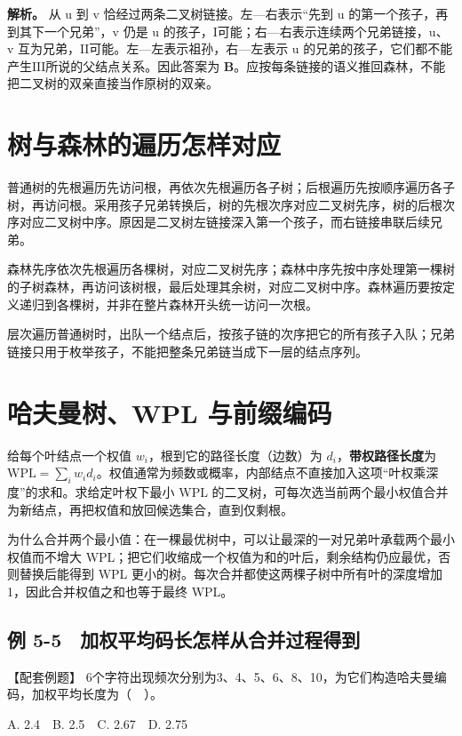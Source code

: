 \textbf{解析。} 从 u 到 v 恰经过两条二叉树链接。左---右表示``先到 u 的第一个孩子，再到其下一个兄弟''，v 仍是 u 的孩子，\ensuremath{\mathrm{I}}可能；右—右表示连续两个兄弟链接，u、v 互为兄弟，\ensuremath{\mathrm{II}}可能。左—左表示祖孙，右—左表示 u 的兄弟的孩子，它们都不能产生\ensuremath{\mathrm{III}}所说的父结点关系。因此答案为 \textbf{B}。应按每条链接的语义推回森林，不能把二叉树的双亲直接当作原树的双亲。

\section{树与森林的遍历怎样对应}\label{DS05-08}

普通树的先根遍历先访问根，再依次先根遍历各子树；后根遍历先按顺序遍历各子树，再访问根。采用孩子兄弟转换后，树的先根次序对应二叉树先序，树的后根次序对应二叉树中序。原因是二叉树左链接深入第一个孩子，而右链接串联后续兄弟。

森林先序依次先根遍历各棵树，对应二叉树先序；森林中序先按中序处理第一棵树的子树森林，再访问该树根，最后处理其余树，对应二叉树中序。森林遍历要按定义递归到各棵树，并非在整片森林开头统一访问一次根。

层次遍历普通树时，出队一个结点后，按孩子链的次序把它的所有孩子入队；兄弟链接只用于枚举孩子，不能把整条兄弟链当成下一层的结点序列。

\section{哈夫曼树、WPL 与前缀编码}\label{DS05-09}

给每个叶结点一个权值 \(w_i\)，根到它的路径长度（边数）为 \(d_i\)，\textbf{带权路径长度}为 \(\mathrm{WPL}=\sum_iw_id_i\)。权值通常为频数或概率，内部结点不直接加入这项``叶权乘深度''的求和。求给定叶权下最小 WPL 的二叉树，可每次选当前两个最小权值合并为新结点，再把权值和放回候选集合，直到仅剩根。

为什么合并两个最小值：在一棵最优树中，可以让最深的一对兄弟叶承载两个最小权值而不增大 WPL；把它们收缩成一个权值为和的叶后，剩余结构仍应最优，否则替换后能得到 WPL 更小的树。每次合并都使这两棵子树中所有叶的深度增加1，因此合并权值之和也等于最终 WPL。

\subsection{例 5-5　加权平均码长怎样从合并过程得到}\label{DS05-ex5}

\begin{example}[配套案例]

【配套例题】 6个字符出现频次分别为3、4、5、6、8、10，为它们构造哈夫曼编码，加权平均长度为（　）。

A. 2.4　B. 2.5　C. 2.67　D. 2.75

\end{example}

